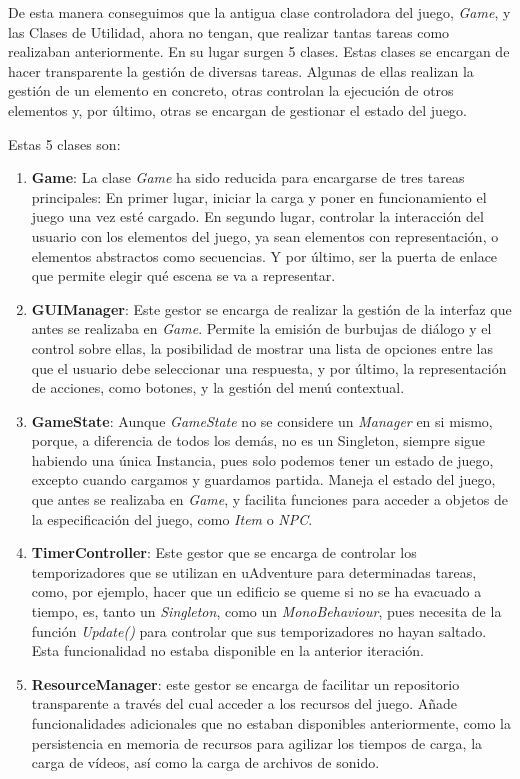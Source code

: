 De esta manera conseguimos que la antigua clase controladora del juego, \textit{Game}, y las Clases de Utilidad, ahora no tengan, que realizar tantas tareas como realizaban anteriormente. En su lugar surgen 5 clases. Estas clases se encargan de hacer transparente la gestión de diversas tareas. Algunas de ellas realizan la gestión de un elemento en concreto, otras controlan la ejecución de otros elementos y, por último, otras se encargan de gestionar el estado del juego.

Estas 5 clases son:
\begin{enumerate}
	\item \textbf{Game}: La clase \textit{Game} ha sido reducida para encargarse de tres tareas principales: En primer lugar, iniciar la carga y poner en funcionamiento el juego una vez esté cargado. En segundo lugar, controlar la interacción del usuario con los elementos del juego, ya sean elementos con representación, o elementos abstractos como secuencias. Y por último, ser la puerta de enlace que permite elegir qué escena se va a representar.
	
	\item \textbf{GUIManager}: Este gestor se encarga de realizar la gestión de la interfaz que antes se realizaba en \textit{Game}. Permite la emisión de burbujas de diálogo y el control sobre ellas, la posibilidad de mostrar una lista de opciones entre las que el usuario debe seleccionar una respuesta, y por último, la representación de acciones, como botones, y la gestión del menú contextual.
	
	\item \textbf{GameState}: Aunque \textit{GameState} no se considere un \textit{Manager} en si mismo, porque, a diferencia de todos los demás, no es un Singleton, siempre sigue habiendo una única Instancia, pues solo podemos tener un estado de juego, excepto cuando cargamos y guardamos partida. Maneja el estado del juego, que antes se realizaba en \textit{Game}, y facilita funciones para acceder a objetos de la especificación del juego, como \textit{Item} o \textit{NPC}.
	
	\item \textbf{TimerController}: Este gestor que se encarga de controlar los temporizadores que se utilizan en uAdventure para determinadas tareas, como, por ejemplo, hacer que un edificio se queme si no se ha evacuado a tiempo, es, tanto un \textit{Singleton}, como un \textit{MonoBehaviour}, pues necesita de la función \textit{Update()} para controlar que sus temporizadores no hayan saltado. Esta funcionalidad no estaba disponible en la anterior iteración.
	
	\item \textbf{ResourceManager}: este gestor se encarga de facilitar un repositorio transparente a través del cual acceder a los recursos del juego. Añade funcionalidades adicionales que no estaban disponibles anteriormente, como la persistencia en memoria de recursos para agilizar los tiempos de carga, la carga de vídeos, así como la carga de archivos de sonido.
\end{enumerate}

